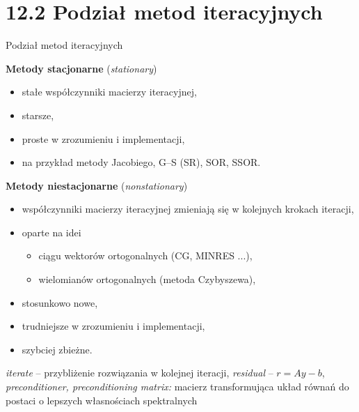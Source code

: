 \section{12.2 Podział metod iteracyjnych}

\begin{frame}{Podział metod iteracyjnych}
  \begin{block}{\textbf{Metody stacjonarne} (\emph{stationary})}
    \begin{itemize}
      \item stałe współczynniki macierzy iteracyjnej,
      \item starsze,
      \item proste w zrozumieniu i implementacji,
      \item na przykład metody Jacobiego, G--S (SR), SOR, SSOR.
    \end{itemize}
  \end{block}
\end{frame}

\begin{frame}{}
  \begin{block}{\textbf{Metody niestacjonarne} (\emph{nonstationary})}
    \begin{itemize}
      \item współczynniki macierzy iteracyjnej zmieniają się w kolejnych krokach iteracji,
      \item oparte na idei
      \begin{itemize}
        \item ciągu wektorów ortogonalnych (CG, MINRES ...),
        \item wielomianów ortogonalnych (metoda Czybyszewa),
      \end{itemize}
      \item stosunkowo nowe,
      \item trudniejsze w zrozumieniu i implementacji,
      \item szybciej zbieżne.
    \end{itemize}
  \end{block}
\end{frame}

\begin{frame}{}     %
  \begin{block}{}
    \emph{iterate} -- przybliżenie rozwiązania w kolejnej iteracji,
    \newline \emph{residual} -- $r=Ay-b$,
    \newline \emph{preconditioner, preconditioning matrix:} macierz transformująca układ równań do postaci o lepszych własnościach spektralnych
  \end{block}
\end{frame}
